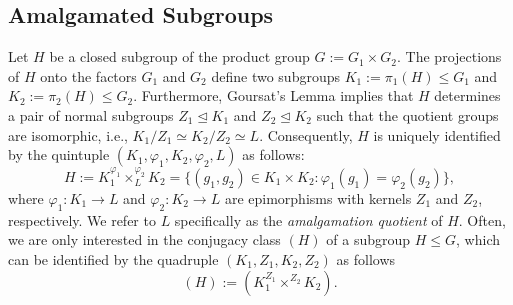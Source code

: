 \documentclass[twoside]{article}%
\begin{document}
\subsection{Amalgamated Subgroups}\label{sec:amalgamated_subgroups} Let $H$ be a closed subgroup of the product group $G := G_1 \times G_2$. The projections of $H$ onto the factors $G_1$ and $G_2$ define two subgroups $K_1 := \pi_1(H) \leq G_1$ and $K_2 := \pi_2(H) \leq G_2$. Furthermore, Goursat's Lemma implies that $H$ determines a pair of normal subgroups $Z_1 \unlhd K_1$ and $Z_2 \unlhd K_2$ such that the quotient groups are isomorphic, i.e., $K_1/Z_1 \simeq K_2/Z_2 \simeq L$. Consequently, $H$ is uniquely identified by the quintuple $(K_1,\varphi_1,K_2,\varphi_2,L)$ as follows:
\[
H := K_1^{\varphi_1} \times_L^{\varphi_2} K_2 = \{ (g_1, g_2) \in K_1 \times K_2 : \varphi_1(g_1) = \varphi_2(g_2) \},
\]
where $\varphi_1: K_1 \to L$ and $\varphi_2: K_2 \to L$ are epimorphisms with kernels $Z_1$ and $Z_2$, respectively. We refer to $L$ specifically as the \textit{amalgamation quotient} of $H$. Often, we are only interested in the conjugacy class $(H)$ of a subgroup $H \leq G$, which can be identified by the quadruple
$(K_1,Z_1,K_2,Z_2)$ as follows
\[
(H) := (K_1^{Z_1} \times^{Z_2} K_2).
\]
\end{document}
